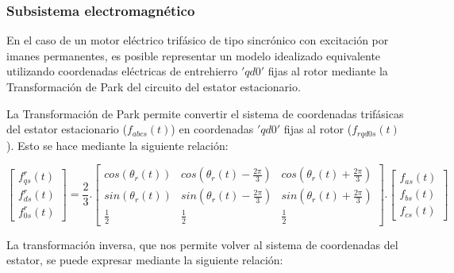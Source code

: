 \documentclass{article}
\begin{document}
    \subsubsection{Subsistema electromagnético}
        
    En el caso de un motor eléctrico trifásico de tipo sincrónico con excitación por imanes permanentes, 
    es posible representar un modelo idealizado equivalente utilizando coordenadas eléctricas de 
    entrehierro $'qd0'$ fijas al rotor mediante la Transformación de Park del circuito del estator 
    estacionario.

    La Transformación de Park permite convertir el sistema de coordenadas trifásicas del estator 
    estacionario ($f_{abcs}(t)$) en coordenadas $'qd0'$ fijas al rotor ($f_{rqd0s}(t)$). Esto se hace 
    mediante la siguiente relación:

    \begin{equation}\label{eq:transformacion_de_park}
        \begin{bmatrix}
            f_{qs}^r(t)\\
            f_{ds}^r(t)\\
            f_{0s}^r(t)
        \end{bmatrix}
        =\frac{2}{3}.
        \begin{bmatrix}
            cos(\theta_r(t)) & cos(\theta_r(t) - \frac{2\pi}{3}) & cos(\theta_r(t) + \frac{2\pi}{3})\\
            sin(\theta_r(t)) & sin(\theta_r(t) - \frac{2\pi}{3}) & sin(\theta_r(t) + \frac{2\pi}{3})\\
            \frac{1}{2} & \frac{1}{2} & \frac{1}{2}
        \end{bmatrix}.
        \begin{bmatrix}
            f_{as}(t)\\
            f_{bs}(t)\\
            f_{cs}(t)
        \end{bmatrix}
    \end{equation}

    La transformación inversa, que nos permite volver al sistema de coordenadas del estator, se puede 
    expresar mediante la siguiente relación:
    
\end{document}
